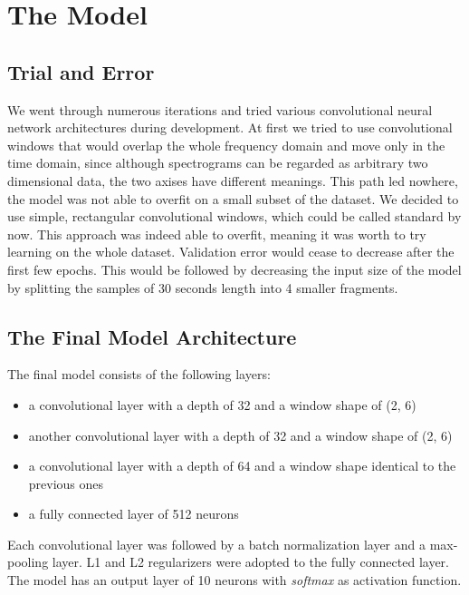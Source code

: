 \documentclass{article}
\begin{document}
    \section{The Model}

    \subsection{Trial and Error}

    We went through numerous iterations and tried various convolutional neural
    network architectures during development. At first we tried to use convolutional
    windows that would overlap the whole frequency domain and move only in the time domain,
    since although spectrograms can be regarded as arbitrary two dimensional data, the two
    axises have different meanings. This path led nowhere, the model was not able to
    overfit on a small subset of the dataset. We decided to use simple, rectangular convolutional
    windows, which could be called standard by now. This approach was indeed able to overfit, meaning
    it was worth to try learning on the whole dataset. Validation error would cease to decrease
    after the first few epochs. This would be followed by decreasing the input size of the model
    by splitting the samples of 30 seconds length into 4 smaller fragments.

    \subsection{The Final Model Architecture}

    The final model consists of the following layers:

    \begin{itemize}
        \item a convolutional layer with a depth of 32 and a window shape of (2, 6)
        \item another convolutional layer with a depth of 32 and a window shape of (2, 6)
        \item a convolutional layer with a depth of 64 and a window shape identical to the previous ones
        \item a fully connected layer of 512 neurons
    \end{itemize}

    Each convolutional layer was followed by a batch normalization
    layer and a max-pooling layer. L1 and L2 regularizers were adopted to the fully connected layer.
    The model has an output layer of 10 neurons with \emph{softmax} as activation function.
\end{document}
